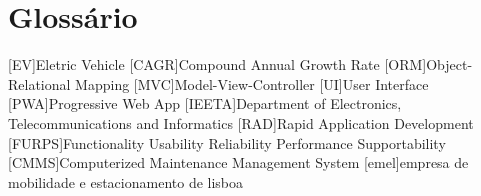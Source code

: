 \chapter{Glossário}

\footnotesize
\SingleSpacing

\begin{multicols}{2}
\begin{acronym}[AAAAAA]

	[EV]{Eletric Vehicle}
	[CAGR]{Compound Annual Growth Rate}
	[ORM]{Object-Relational Mapping}
	[MVC]{Model-View-Controller}
	[UI]{User Interface}
	[PWA]{Progressive Web App}
	[IEETA]{Department of Electronics, Telecommunications and Informatics}
	[RAD]{Rapid Application Development}
	[FURPS]{Functionality Usability Reliability Performance Supportability}
	[CMMS]{Computerized Maintenance Management System}
	[emel]{empresa de mobilidade e estacionamento de lisboa}
	

\end{acronym}
\end{multicols}

